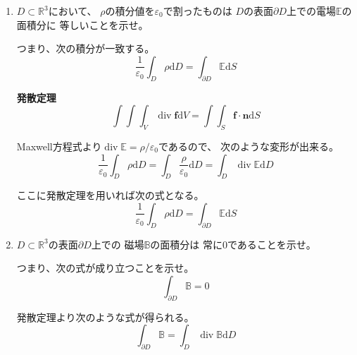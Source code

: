 \documentclass[12pt,b5paper]{ltjsarticle}
\DeclareMathOperator{\Div}{div}
\begin{document}
\begin{enumerate}
 \item
      $D\subset\mathbb{R}^3$において、
      $\rho$の積分値を$\varepsilon_0$で割ったものは
      $D$の表面$\partial D$上での電場$\mathbb{E}$の面積分に
      等しいことを示せ。

      つまり、次の積分が一致する。
      \begin{equation}
       \frac{1}{\varepsilon_0} \int_{D} \rho \mathrm{d}D
        = \int_{\partial D}\mathbb{E}\mathrm{d}S
      \end{equation}

      \dotfill

      \textbf{発散定理}
      \begin{equation}
       \int\!\!\!\int\!\!\!\int_V \Div\bm{f}\mathrm{d}V
        = \int\!\!\!\int_S \bm{f}\cdot\bm{n}\mathrm{d}S
      \end{equation}

      \dotfill

      Maxwell方程式より$\Div\mathbb{E}=\rho/\varepsilon_0$であるので、
      次のような変形が出来る。
      \begin{equation}
       \frac{1}{\varepsilon_0} \int_{D} \rho \mathrm{d}D
        = \int_{D} \frac{\rho}{\varepsilon_0} \mathrm{d}D
        = \int_{D} \Div\mathbb{E} \mathrm{d}D
      \end{equation}

      ここに発散定理を用いれば次の式となる。
      \begin{equation}
       \frac{1}{\varepsilon_0} \int_{D} \rho \mathrm{d}D
        = \int_{\partial D}\mathbb{E}\mathrm{d}S
      \end{equation}

      \hrulefill

 \item
      $D\subset\mathbb{R}^3$の表面$\partial D$上での
      磁場$\mathbb{B}$の面積分は
      常に0であることを示せ。

      つまり、次の式が成り立つことを示せ。
      \begin{equation}
       \int_{\partial D}\mathbb{B} =0
      \end{equation}

      \dotfill

      発散定理より次のような式が得られる。
      \begin{equation}
       \int_{\partial D}\mathbb{B}
        = \int_{D}\Div\mathbb{B} \mathrm{d}D
      \end{equation}


\end{enumerate}
\end{document}
